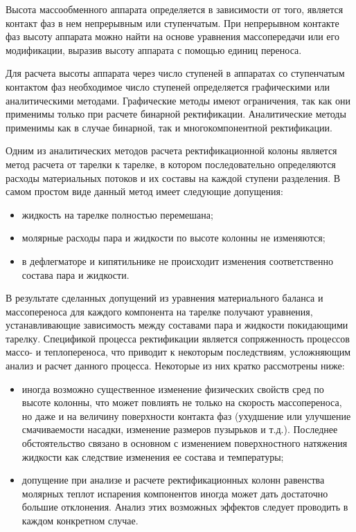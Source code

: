 Высота массообменного аппарата определяется в зависимости от того, является контакт фаз в нем непрерывным или ступенчатым. При непрерывном контакте фаз высоту аппарата можно найти на основе уравнения массопередачи или его модификации, выразив высоту аппарата с помощью единиц переноса.

Для расчета высоты аппарата через число ступеней в аппаратах со ступенчатым контактом фаз необходимое число ступеней определяется графическими или аналитическими методами. Графические методы имеют ограничения, так как они применимы только при расчете бинарной ректификации. Аналитические методы применимы как в случае бинарной, так и многокомпонентной ректификации.

Одним из аналитических методов расчета ректификационной колоны является метод расчета от тарелки к тарелке, в котором последовательно определяются расходы материальных потоков и их составы на каждой ступени разделения. В самом простом виде данный метод имеет следующие допущения:
\begin{itemize}
	\item жидкость на тарелке полностью перемешана;
	\item молярные расходы пара и жидкости по высоте  колонны не изменяются;
	\item в дефлегматоре и кипятильнике не происходит изменения соответственно состава пара и жидкости.
\end{itemize}

В результате сделанных допущений из уравнения материального баланса и массопереноса для каждого компонента на тарелке получают уравнения, устанавливающие зависимость между составами пара и жидкости покидающими тарелку. 
Спецификой процесса ректификации является сопряженность процессов массо- и теплопереноса, что приводит к некоторым последствиям, усложняющим анализ и расчет данного процесса. Некоторые из них кратко рассмотрены ниже:
\begin{itemize}
	\item иногда возможно существенное изменение физических свойств сред по высоте колонны, что может повлиять не только на скорость массопереноса, но даже и на величину поверхности контакта фаз (ухудшение или улучшение смачиваемости насадки, изменение размеров пузырьков и т.д.). Последнее обстоятельство связано в основном с изменением поверхностного натяжения жидкости как следствие изменения ее состава и температуры;
	\item допущение при анализе и расчете ректификационных колонн равенства молярных теплот испарения компонентов иногда может дать достаточно большие отклонения. Анализ этих возможных эффектов следует проводить в каждом конкретном случае.
\end{itemize}

